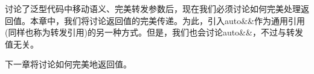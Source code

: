 讨论了泛型代码中移动语义、完美转发参数后，现在我们必须讨论如何完美处理返回值。本章中，我们将讨论返回值的完美传递。为此，引入auto\&\&作为通用引用(同样也称为转发引用)的另一种方式。但是，我们也会讨论auto\&\&，不过与转发值无关。\par

下一章将讨论如何完美地返回值。\par